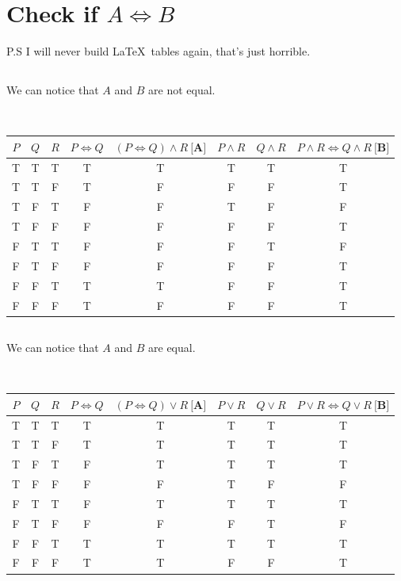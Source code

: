 \documentclass[a4paper, 12pt]{article}
\newcommand{\sub}[1]{\subsection{\underline{#1}}}
\newcommand{\?}{\stackrel{?}{=}}
\renewcommand{\b}[1]{\textbf{#1}}
\begin{document}
\section{Check if $A \iff B$}
P.S I will never build \LaTeX~tables again, that's just horrible.
\sub{}
We can notice that $A$ and $B$ are not equal.
\begin{center}
    ~\\
    \begin{tabular}{|c|c|c|c|c|c|c|c|} 
    \hline
    $P$ & $Q$ & $R$ & $P\Leftrightarrow{Q}$ & $(P\Leftrightarrow{Q})\land{R}~\b{[A]}$ & $P\land{R}$ & $Q\land{R}$ & $P\land{R} \Leftrightarrow Q\land{R}~\b{[B]}$ \\ [0.5ex] 
    \hline
    T & T & T & T & T & T & T & T\\
    \hline
    T & T & F & T & F & F & F & T\\
    \hline
    T & F & T & F & F & T & F & F\\
    \hline
    T & F & F & F & F & F & F & T\\
    \hline
    F & T & T & F & F & F & T & F\\
    \hline
    F & T & F & F & F & F & F & T\\
    \hline
    F & F & T & T & T & F & F & T\\
    \hline
    F & F & F & T & F & F & F & T\\
    \hline
   \end{tabular}
\end{center}

\sub{}
We can notice that $A$ and $B$ are equal.
\begin{center}
    ~\\
    \begin{tabular}{|c|c|c|c|c|c|c|c|} 
    \hline
    $P$ & $Q$ & $R$ & $P\Leftrightarrow{Q}$ & $(P\Leftrightarrow{Q})\lor{R}~\b{[A]}$ & $P\lor{R}$ & $Q\lor{R}$ & $P\lor{R} \Leftrightarrow Q\lor{R}~\b{[B]}$ \\ [0.5ex] 
    \hline
    T & T & T & T & T & T & T & T\\
    \hline
    T & T & F & T & T & T & T & T\\
    \hline
    T & F & T & F & T & T & T & T\\
    \hline
    T & F & F & F & F & T & F & F\\
    \hline
    F & T & T & F & T & T & T & T\\
    \hline
    F & T & F & F & F & F & T & F\\
    \hline
    F & F & T & T & T & T & T & T\\
    \hline
    F & F & F & T & T & F & F & T\\
    \hline
   \end{tabular}
\end{center}
\end{document}
